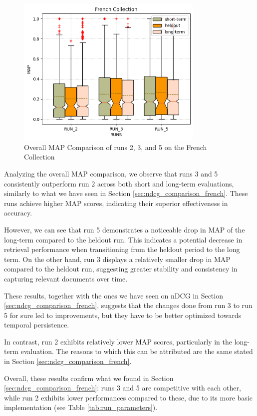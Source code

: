 \begin{figure}[!h]
    \centering
    \includegraphics[width=0.8\textwidth]{figure/StatisticalAnalysis/BoxPlot/MAP French.png}
    \caption{Overall MAP Comparison of runs 2, 3, and 5 on the French Collection}
    \label{fig:map_french}
\end{figure}

Analyzing the overall \ac{MAP} comparison, we observe that runs 3 and 5 consistently outperform run 2 across both short and long-term evaluations, similarly to what we have seen in Section \ref{sec:ndcg_comparison_french}.
These runs achieve higher \ac{MAP} scores, indicating their superior effectiveness in accuracy.  

However, we can see that run 5 demonstrates a noticeable drop in \ac{MAP} of the long-term compared to the heldout run. 
This indicates a potential decrease in retrieval performance when transitioning from the heldout period to the long term. 
On the other hand, run 3 displays a relatively smaller drop in \ac{MAP} compared to the heldout run, suggesting greater stability and consistency in capturing relevant documents over time.

These results, together with the ones we have seen on \ac{nDCG} in Section \ref{sec:ndcg_comparison_french}, suggests that the changes done from run 3 to run 5 for sure led to improvements, but they have to be better optimized towards temporal persistence.

In contrast, run 2 exhibits relatively lower \ac{MAP} scores, particularly in the long-term evaluation. The reasons to which this can be attributed are the same stated in Section \ref{sec:ndcg_comparison_french}.

Overall, these results confirm what we found in Section \ref{sec:ndcg_comparison_french}: runs 3 and 5 are competitive with each other, while run 2 exhibits lower performances compared to these, due to its more basic implementation (see Table \ref{tab:run_parameters}). 


